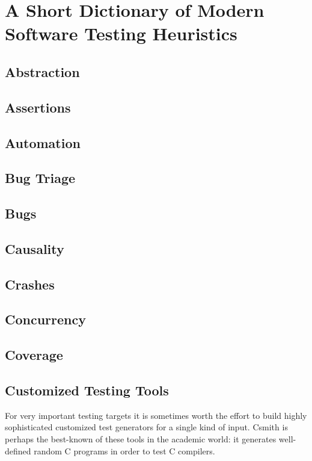 \part{A Short Dictionary of Modern Software Testing Heuristics}

\chapter{Abstraction}

\chapter{Assertions}

\chapter{Automation}

\chapter{Bug Triage}

\chapter{Bugs}

\chapter{Causality}

\chapter{Crashes}

\chapter{Concurrency}

\chapter{Coverage}

\chapter{Customized Testing Tools}

For very important testing targets  it is
sometimes worth the effort to build highly sophisticated customized
test generators for a single kind of input.  Csmith \cite{csmith} is
perhaps the best-known of these tools in the academic world:  it
generates well-defined random C programs in order to test C compilers.

